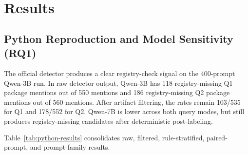 \documentclass[pdflatex,sn-basic]{sn-jnl}
\begin{document}
\section{Results}

\subsection{Python Reproduction and Model Sensitivity (RQ1)}

The official detector produces a clear registry-check signal on the 400-prompt Qwen-3B run. In raw detector output, Qwen-3B has 118 registry-missing Q1 package mentions out of 550 mentions and 186 registry-missing Q2 package mentions out of 560 mentions. After artifact filtering, the rates remain 103/535 for Q1 and 178/552 for Q2. Qwen-7B is lower across both query modes, but still produces registry-missing candidates after deterministic post-labeling.

Table~\ref{tab:python-results} consolidates raw, filtered, rule-stratified, paired-prompt, and prompt-family results.
\end{document}
